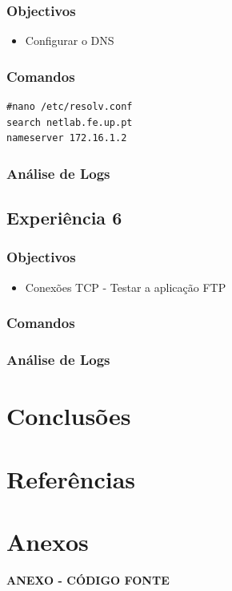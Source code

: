 \documentclass[a4paper,11pt]{article}
\begin{document}
\subsubsection{Objectivos}

\begin{itemize}
\item Configurar o DNS
\end{itemize}

\subsubsection{Comandos}

\begin{lstlisting}
#nano /etc/resolv.conf
search netlab.fe.up.pt
nameserver 172.16.1.2
\end{lstlisting}

\subsubsection{Análise de Logs}

\subsection{Experiência 6}
\subsubsection{Objectivos}

\begin{itemize}
\item Conexões TCP - Testar a aplicação FTP
\end{itemize}

\subsubsection{Comandos}

\subsubsection{Análise de Logs}

\section{Conclusões}

\section{Referências}

\section{Anexos}

\newpage

\vspace*{\fill} 
\centering
\begin{Huge}\textbf{ANEXO - CÓDIGO FONTE}\end{Huge}
\vspace*{\fill}
\thispagestyle{empty}
\setcounter{page}{1}
\end{document}

